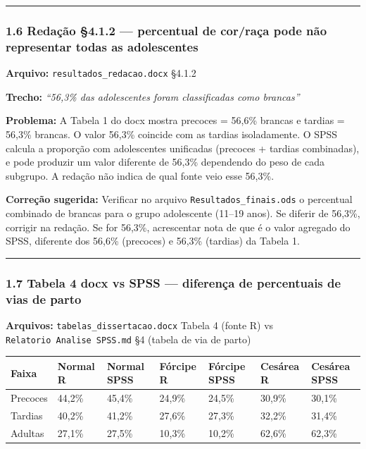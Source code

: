 \documentclass[
]{article}
\begin{document}
\begin{center}\rule{0.5\linewidth}{0.5pt}\end{center}

\hypertarget{redauxe7uxe3o-4.1.2-percentual-de-corrauxe7a-pode-nuxe3o-representar-todas-as-adolescentes}{%
\subsubsection{1.6 Redação §4.1.2 --- percentual de cor/raça pode não
representar todas as
adolescentes}\label{redauxe7uxe3o-4.1.2-percentual-de-corrauxe7a-pode-nuxe3o-representar-todas-as-adolescentes}}

\textbf{Arquivo:} \texttt{resultados\_redacao.docx} §4.1.2

\textbf{Trecho:} \emph{``56,3\% das adolescentes foram classificadas
como brancas''}

\textbf{Problema:} A Tabela 1 do docx mostra precoces = 56,6\% brancas e
tardias = 56,3\% brancas. O valor 56,3\% coincide com as tardias
isoladamente. O SPSS calcula a proporção com adolescentes unificadas
(precoces + tardias combinadas), e pode produzir um valor diferente de
56,3\% dependendo do peso de cada subgrupo. A redação não indica de qual
fonte veio esse 56,3\%.

\textbf{Correção sugerida:} Verificar no arquivo
\texttt{Resultados\_finais.ods} o percentual combinado de brancas para o
grupo adolescente (11--19 anos). Se diferir de 56,3\%, corrigir na
redação. Se for 56,3\%, acrescentar nota de que é o valor agregado do
SPSS, diferente dos 56,6\% (precoces) e 56,3\% (tardias) da Tabela 1.

\begin{center}\rule{0.5\linewidth}{0.5pt}\end{center}

\hypertarget{tabela-4-docx-vs-spss-diferenuxe7a-de-percentuais-de-vias-de-parto}{%
\subsubsection{1.7 Tabela 4 docx vs SPSS --- diferença de percentuais de
vias de
parto}\label{tabela-4-docx-vs-spss-diferenuxe7a-de-percentuais-de-vias-de-parto}}

\textbf{Arquivos:} \texttt{tabelas\_dissertacao.docx} Tabela 4 (fonte R)
vs \texttt{Relatorio\ Analise\ SPSS.md} §4 (tabela de via de parto)

\begin{longtable}[]{@{}lllllll@{}}
\toprule
Faixa & Normal R & Normal SPSS & Fórcipe R & Fórcipe SPSS & Cesárea R &
Cesárea SPSS\tabularnewline
\midrule
\endhead
Precoces & 44,2\% & 45,4\% & 24,9\% & 24,5\% & 30,9\% &
30,1\%\tabularnewline
Tardias & 40,2\% & 41,2\% & 27,6\% & 27,3\% & 32,2\% &
31,4\%\tabularnewline
Adultas & 27,1\% & 27,5\% & 10,3\% & 10,2\% & 62,6\% &
62,3\%\tabularnewline
\bottomrule
\end{longtable}
\end{document}
